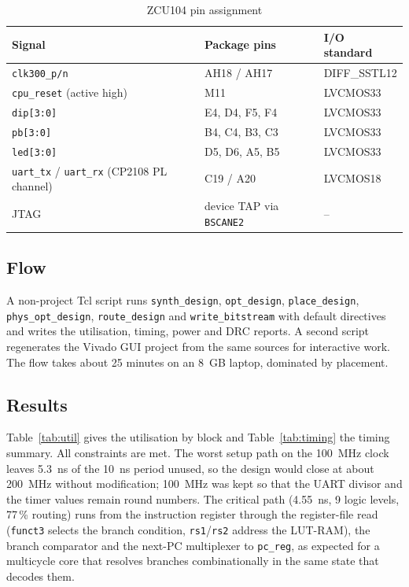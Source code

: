 \documentclass[journal,10pt]{IEEEtran}
\newcommand{\reg}[1]{\texttt{#1}}
\begin{document}
\begin{table}[t]
\caption{ZCU104 pin assignment}
\label{tab:pins}
\centering
\footnotesize
\begin{tabular}{@{}p{3.3cm}p{2.5cm}l@{}}
\toprule
Signal & Package pins & I/O standard \\
\midrule
\reg{clk300\_p/n} & AH18 / AH17 & DIFF\_SSTL12 \\
\reg{cpu\_reset} (active high) & M11 & LVCMOS33 \\
\reg{dip[3:0]} & E4, D4, F5, F4 & LVCMOS33 \\
\reg{pb[3:0]} & B4, C4, B3, C3 & LVCMOS33 \\
\reg{led[3:0]} & D5, D6, A5, B5 & LVCMOS33 \\
\reg{uart\_tx} / \reg{uart\_rx} (CP2108 PL channel) & C19 / A20 & LVCMOS18 \\
JTAG & device TAP via \reg{BSCANE2} & -- \\
\bottomrule
\end{tabular}
\end{table}

\subsection{Flow}
A non-project Tcl script runs \reg{synth\_design}, \reg{opt\_design},
\reg{place\_design}, \reg{phys\_opt\_design}, \reg{route\_design} and
\reg{write\_bitstream} with default directives and writes the utilisation,
timing, power and DRC reports. A second script regenerates the Vivado GUI
project from the same sources for interactive work. The flow takes about 25
minutes on an 8~GB laptop, dominated by placement.

\subsection{Results}
Table~\ref{tab:util} gives the utilisation by block and
Table~\ref{tab:timing} the timing summary. All constraints are met. The
worst setup path on the 100~MHz clock leaves 5.3~ns of the 10~ns period
unused, so the design would close at about 200~MHz without modification;
100~MHz was kept so that the UART divisor and the timer values remain round
numbers. The critical path (4.55~ns, 9 logic levels, 77\,\% routing) runs from
the instruction register through the register-file read (\reg{funct3}
selects the branch condition, \reg{rs1}/\reg{rs2} address the LUT-RAM),
the branch comparator and the next-PC multiplexer to \reg{pc\_reg}, as
expected for a multicycle core that resolves branches combinationally in
the same state that decodes them.
\end{document}
